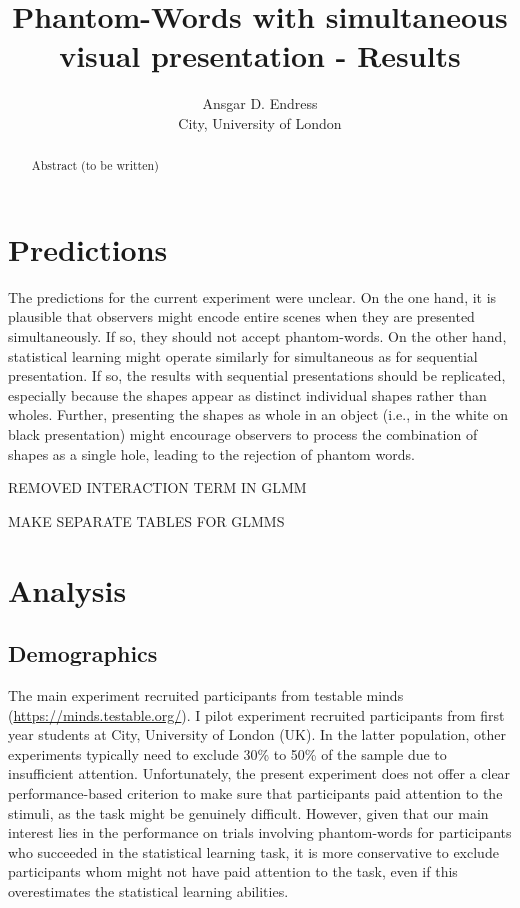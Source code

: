 \documentclass[
]{article}
\title{Phantom-Words with simultaneous visual presentation - Results}
\author{Ansgar D. Endress\\
City, University of London}
\date{}
\begin{document}
\maketitle
\begin{abstract}
Abstract (to be written)
\end{abstract}

\section{Predictions}\label{predictions}

The predictions for the current experiment were unclear. On the one
hand, it is plausible that observers might encode entire scenes when
they are presented simultaneously. If so, they should not accept
phantom-words. On the other hand, statistical learning might operate
similarly for simultaneous as for sequential presentation. If so, the
results with sequential presentations should be replicated, especially
because the shapes appear as distinct individual shapes rather than
wholes. Further, presenting the shapes as whole in an object (i.e., in
the white on black presentation) might encourage observers to process
the combination of shapes as a single hole, leading to the rejection of
phantom words.

REMOVED INTERACTION TERM IN GLMM

MAKE SEPARATE TABLES FOR GLMMS

\section{Analysis}\label{analysis}

\subsection{Demographics}\label{demographics}

The main experiment recruited participants from testable minds
(\url{https://minds.testable.org/}). I pilot experiment recruited
participants from first year students at City, University of London
(UK). In the latter population, other experiments typically need to
exclude 30\% to 50\% of the sample due to insufficient attention.
Unfortunately, the present experiment does not offer a clear
performance-based criterion to make sure that participants paid
attention to the stimuli, as the task might be genuinely difficult.
However, given that our main interest lies in the performance on trials
involving phantom-words for participants who succeeded in the
statistical learning task, it is more conservative to exclude
participants whom might not have paid attention to the task, even if
this overestimates the statistical learning abilities.
\end{document}
